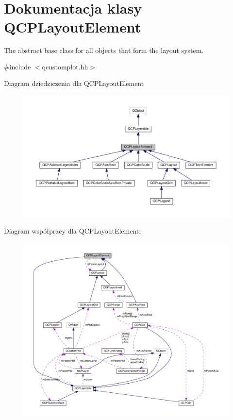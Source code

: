 \hypertarget{class_q_c_p_layout_element}{}\section{Dokumentacja klasy Q\+C\+P\+Layout\+Element}
\label{class_q_c_p_layout_element}


The abstract base class for all objects that form the layout system.  




{\ttfamily \#include $<$qcustomplot.\+hh$>$}



Diagram dziedziczenia dla Q\+C\+P\+Layout\+Element\nopagebreak
\begin{figure}[H]
\begin{center}
\leavevmode
\includegraphics[width=350pt]{class_q_c_p_layout_element__inherit__graph}
\end{center}
\end{figure}


Diagram współpracy dla Q\+C\+P\+Layout\+Element\+:\nopagebreak
\begin{figure}[H]
\begin{center}
\leavevmode
\includegraphics[width=350pt]{class_q_c_p_layout_element__coll__graph}
\end{center}
\end{figure}
